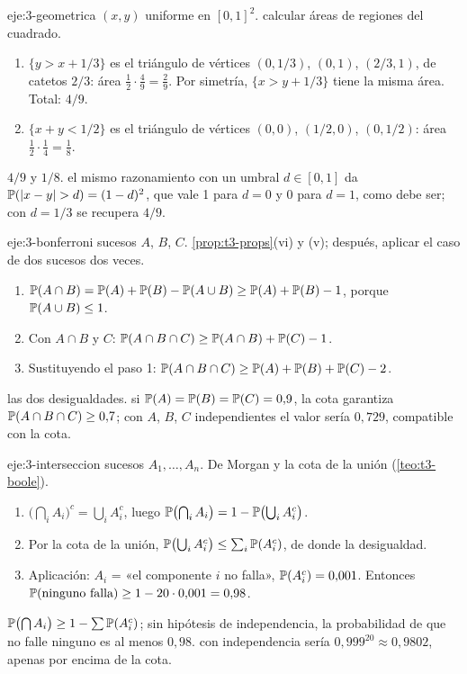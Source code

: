 \begin{solucion}{eje:3-geometrica}
\datos $(x,y)$ uniforme en $[0,1]^{2}$.
\planteamiento calcular áreas de regiones del cuadrado.
\pasos
\begin{enumerate}[label=\arabic*.]
  \item $\{y>x+1/3\}$ es el triángulo de vértices $(0,1/3)$, $(0,1)$, $(2/3,1)$, de catetos $2/3$: área $\frac12\cdot\frac49=\frac29$. Por simetría, $\{x>y+1/3\}$ tiene la misma área. Total: $4/9$.
  \item $\{x+y<1/2\}$ es el triángulo de vértices $(0,0)$, $(1/2,0)$, $(0,1/2)$: área $\frac12\cdot\frac14=\frac18$.
\end{enumerate}
\resultado $4/9$ y $1/8$.
\comprobacion el mismo razonamiento con un umbral $d\in[0,1]$ da $\mathbb{P}(\lvert x-y\rvert>d)=(1-d)^{2}$, que vale 1 para $d=0$ y 0 para $d=1$, como debe ser; con $d=1/3$ se recupera $4/9$.
\end{solucion}

\begin{solucion}{eje:3-bonferroni}
\datos sucesos $A$, $B$, $C$.
\planteamiento \cref{prop:t3-props}(vi) y (v); después, aplicar el caso de dos sucesos dos veces.
\pasos
\begin{enumerate}[label=\arabic*.]
  \item $\mathbb{P}(A\cap B)=\mathbb{P}(A)+\mathbb{P}(B)-\mathbb{P}(A\cup B)\ge\mathbb{P}(A)+\mathbb{P}(B)-1$, porque $\mathbb{P}(A\cup B)\le1$.
  \item Con $A\cap B$ y $C$: $\mathbb{P}(A\cap B\cap C)\ge\mathbb{P}(A\cap B)+\mathbb{P}(C)-1$.
  \item Sustituyendo el paso 1: $\mathbb{P}(A\cap B\cap C)\ge\mathbb{P}(A)+\mathbb{P}(B)+\mathbb{P}(C)-2$.
\end{enumerate}
\resultado las dos desigualdades.
\comprobacion si $\mathbb{P}(A)=\mathbb{P}(B)=\mathbb{P}(C)=0{,}9$, la cota garantiza $\mathbb{P}(A\cap B\cap C)\ge0{,}7$; con $A$, $B$, $C$ independientes el valor sería $0{,}729$, compatible con la cota.
\end{solucion}

\begin{solucion}{eje:3-interseccion}
\datos sucesos $A_1,\dots,A_n$.
\planteamiento De Morgan y la cota de la unión (\cref{teo:t3-boole}).
\pasos
\begin{enumerate}[label=\arabic*.]
  \item $\bigl(\bigcap_iA_i\bigr)^{c}=\bigcup_iA_i^{c}$, luego $\mathbb{P}\bigl(\bigcap_iA_i\bigr)=1-\mathbb{P}\bigl(\bigcup_iA_i^{c}\bigr)$.
  \item Por la cota de la unión, $\mathbb{P}\bigl(\bigcup_iA_i^{c}\bigr)\le\sum_i\mathbb{P}(A_i^{c})$, de donde la desigualdad.
  \item Aplicación: $A_i$ = «el componente $i$ no falla», $\mathbb{P}(A_i^{c})=0{,}001$. Entonces $\mathbb{P}(\text{ninguno falla})\ge1-20\cdot0{,}001=0{,}98$.
\end{enumerate}
\resultado $\mathbb{P}\bigl(\bigcap A_i\bigr)\ge1-\sum\mathbb{P}(A_i^{c})$; sin hipótesis de independencia, la probabilidad de que no falle ninguno es al menos $0{,}98$.
\comprobacion con independencia sería $0{,}999^{20}\approx0{,}9802$, apenas por encima de la cota.
\end{solucion}


